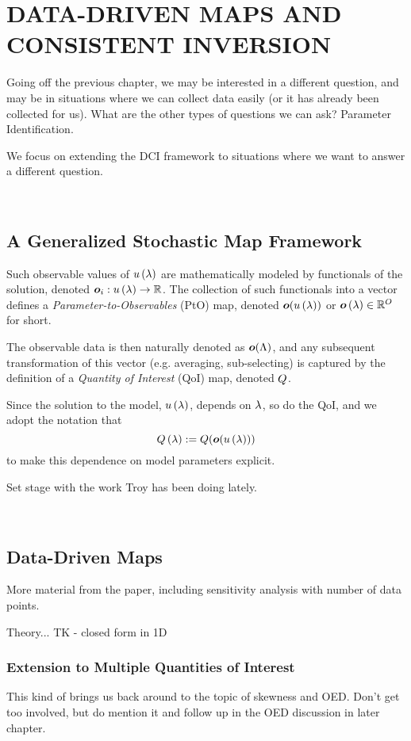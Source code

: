 \chapter{\uppercase{Data-Driven Maps and Consistent Inversion} \label{chapter:04}}

Going off the previous chapter, we may be interested in a different question, and may be in situations where we can collect data easily (or it has already been collected for us).
What are the other types of questions we can ask? Parameter Identification. 

We focus on extending the DCI framework to situations where we want to answer a different question.

\
\section{A Generalized Stochastic Map Framework}
Such observable values of $u\left ( \lambda \right )$ are mathematically modeled by functionals of the solution, denoted $\operatorname*{\boldsymbol{o}}_i: u\left ( \lambda \right ) \to \mathbb{R}$.
The collection of such functionals into a vector defines a {\em Parameter-to-Observables} (PtO) map, denoted $\operatorname*{\boldsymbol{o}}( u\left ( \lambda \right ) )$ or $\operatorname*{\boldsymbol{o}}\left ( \lambda \right )\in\mathbb{R}^O$ for short. 

The observable data is then naturally denoted as $\operatorname*{\boldsymbol{o}}({\Lambda})$, and any subsequent transformation of this vector (e.g. averaging, sub-selecting) is captured by the definition of a {\em Quantity of Interest} (QoI) map, denoted $Q$.

Since the solution to the model, $u\left ( \lambda \right )$, depends on $\lambda$, so do the QoI, and we adopt the notation that $$Q\left ( \lambda \right ) := Q(\operatorname*{\boldsymbol{o}}(u\left ( \lambda \right )))$$ to make this dependence on model parameters explicit.

Set stage with the work Troy has been doing lately.

\
\section{Data-Driven Maps}

More material from the paper, including sensitivity analysis with number of data points.

Theory... TK - closed form in 1D


\subsection{Extension to Multiple Quantities of Interest}

This kind of brings us back around to the topic of skewness and OED. Don't get too involved, but do mention it and follow up in the OED discussion in later chapter.

